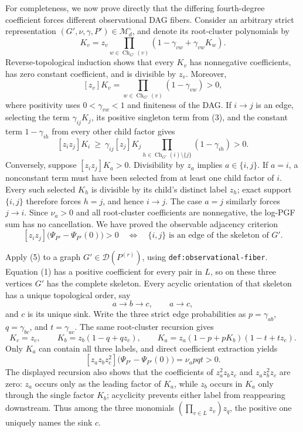 For completeness, we now prove directly that the differing fourth-degree coefficient forces different observational DAG fibers.  Consider an arbitrary strict representation \((G',\nu,\gamma,P')\in\mathcal M_d^\circ\), and denote its root-cluster polynomials by
\[
K_v=z_v\prod_{w\in\operatorname{Ch}_{G'}(v)}
       (1-\gamma_{vw}+\gamma_{vw}K_w).
\]
Reverse-topological induction shows that every \(K_v\) has nonnegative coefficients, has zero constant coefficient, and is divisible by \(z_v\).  Moreover,
\[
[z_v]K_v=\prod_{w\in\operatorname{Ch}_{G'}(v)}(1-\gamma_{vw})>0,
\tag{3}
\]
where positivity uses \(0<\gamma_{vw}<1\) and finiteness of the DAG.  If \(i\to j\) is an edge, selecting the term \(\gamma_{ij}K_j\), its positive singleton term from (3), and the constant term \(1-\gamma_{ih}\) from every other child factor gives
\[
[z_iz_j]K_i\ \geq\
\gamma_{ij}[z_j]K_j
\prod_{h\in\operatorname{Ch}_{G'}(i)\setminus\{j\}}(1-\gamma_{ih})>0.
\tag{4}
\]
Conversely, suppose \([z_iz_j]K_a>0\).  Divisibility by \(z_a\) implies \(a\in\{i,j\}\).  If \(a=i\), a nonconstant term must have been selected from at least one child factor of \(i\).  Every such selected \(K_h\) is divisible by its child's distinct label \(z_h\); exact support \(\{i,j\}\) therefore forces \(h=j\), and hence \(i\to j\).  The case \(a=j\) similarly forces \(j\to i\).  Since \(\nu_a>0\) and all root-cluster coefficients are nonnegative, the log-PGF sum has no cancellation.  We have proved the observable adjacency criterion
\[
[z_iz_j]\bigl(\Psi_{P'}-\Psi_{P'}(0)\bigr)>0
\quad\Longleftrightarrow\quad
\{i,j\}\text{ is an edge of the skeleton of }G'.
\tag{5}
\]

Apply (5) to a graph \(G'\in\mathcal D(P^{(r)})\), using \texttt{def:observational-fiber}.  Equation (1) has a positive coefficient for every pair in \(L\), so on these three vertices \(G'\) has the complete skeleton.  Every acyclic orientation of that skeleton has a unique topological order, say
\[
a\longrightarrow b\longrightarrow c,
\qquad a\longrightarrow c,
\]
and \(c\) is its unique sink.  Write the three strict edge probabilities as \(p=\gamma_{ab}\), \(q=\gamma_{bc}\), and \(t=\gamma_{ac}\).  The same root-cluster recursion gives
\[
K_c=z_c,
\qquad
K_b=z_b(1-q+qz_c),
\qquad
K_a=z_a(1-p+pK_b)(1-t+tz_c).
\]
Only \(K_a\) can contain all three labels, and direct coefficient extraction yields
\[
\left[z_az_bz_c^2\right]
\bigl(\Psi_{P'}-\Psi_{P'}(0)\bigr)=\nu_a pqt>0.
\tag{6}
\]
The displayed recursion also shows that the coefficients of \(z_a^2z_bz_c\) and \(z_az_b^2z_c\) are zero: \(z_a\) occurs only as the leading factor of \(K_a\), while \(z_b\) occurs in \(K_a\) only through the single factor \(K_b\); acyclicity prevents either label from reappearing downstream.  Thus among the three monomials \((\prod_{v\in L}z_v)z_q\), the positive one uniquely names the sink \(c\).

